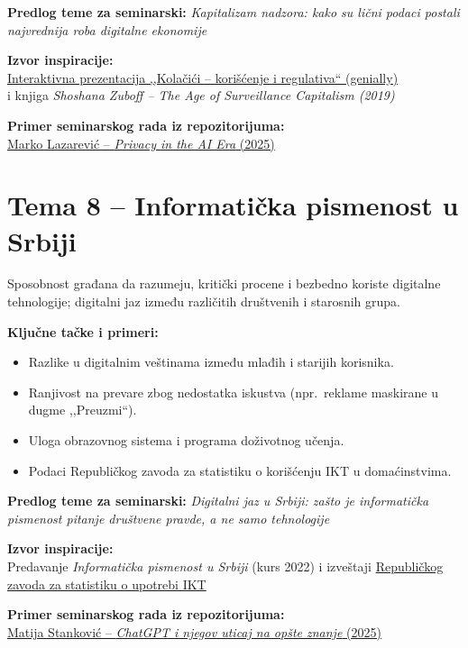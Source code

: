 \documentclass[12pt,a4paper]{article}
\begin{document}
\textbf{Predlog teme za seminarski:}
\emph{Kapitalizam nadzora: kako su lični podaci postali najvrednija roba digitalne
ekonomije}

\textbf{Izvor inspiracije:}\\
\href{https://view.genial.ly/6258686f17af9f0011537dc1/presentation-kolacici-koriscenje-i-regulativa}%
{Interaktivna prezentacija ,,Kolačići -- korišćenje i regulativa`` (genially)}\\
i knjiga \emph{Shoshana Zuboff -- The Age of Surveillance Capitalism (2019)}

\textbf{Primer seminarskog rada iz repozitorijuma:}\\
\href{https://github.com/sanastojanovic/RID/blob/main/rid_2025_seminarski/mi21098_Marko_Lazarevic/seminarski/Privacy_in_the_AI_era.pdf}%
{Marko Lazarević -- \emph{Privacy in the AI Era} (2025)}

\section{Tema 8 -- Informatička pismenost u Srbiji}

Sposobnost građana da razumeju, kritički procene i bezbedno koriste digitalne
tehnologije; digitalni jaz između različitih društvenih i starosnih grupa.

\textbf{Ključne tačke i primeri:}
\begin{itemize}
    \item Razlike u digitalnim veštinama između mlađih i starijih korisnika.
    \item Ranjivost na prevare zbog nedostatka iskustva (npr.\ reklame maskirane u
          dugme ,,Preuzmi``).
    \item Uloga obrazovnog sistema i programa doživotnog učenja.
    \item Podaci Republičkog zavoda za statistiku o korišćenju IKT u domaćinstvima.
\end{itemize}

\textbf{Predlog teme za seminarski:}
\emph{Digitalni jaz u Srbiji: zašto je informatička pismenost pitanje društvene
pravde, a ne samo tehnologije}

\textbf{Izvor inspiracije:}\\
Predavanje \emph{Informatička pismenost u Srbiji} (kurs 2022) i izveštaji
\href{https://www.stat.gov.rs/}{Republičkog zavoda za statistiku o upotrebi IKT}

\textbf{Primer seminarskog rada iz repozitorijuma:}\\
\href{https://github.com/sanastojanovic/RID/blob/main/rid_2025_seminarski/mi21207_Matija_Stankovic/seminarski/ChatGPT_i_njegov_uticaj_na_op\%C5\%A1te_znanje.pdf}%
{Matija Stanković -- \emph{ChatGPT i njegov uticaj na opšte znanje} (2025)}
\end{document}
